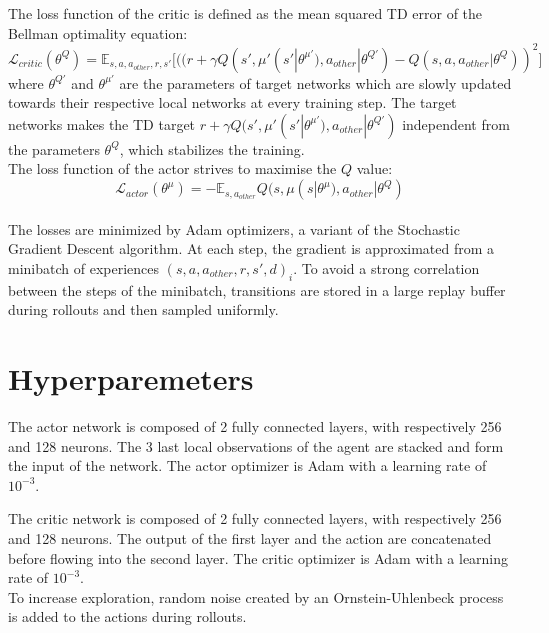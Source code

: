 \documentclass{article}
\begin{document}
    The loss function of the critic is defined as the mean squared TD error of the Bellman optimality equation:
    \[
        \mathcal{L}_{critic}(\theta^Q) = \mathbb{E}_{s, a, a_{other}, r, s'} \big[((r + \gamma Q(s', \mu'(s'| \theta^{\mu'}), a_{other}| \theta^{Q'}) - Q(s, a, a_{other}| \theta^Q))^2\big]
    \]
    where $\theta^{Q'}$ and $\theta^{\mu'}$ are the parameters of target networks which are slowly updated towards their respective local networks at every training step.
    The target networks makes the TD target $r + \gamma Q(s', \mu'(s'| \theta^{\mu'}), a_{other}| \theta^{Q'})$ independent from the parameters $\theta^Q$,
    which stabilizes the training.\\

    The loss function of the actor strives to maximise the $Q$ value:
    \[
        \mathcal{L}_{actor}(\theta^{\mu}) = - \mathbb{E}_{s, a_{other}} Q(s, \mu(s | \theta^\mu), a_{other} | \theta^Q)
    \]\\

    The losses are minimized by Adam optimizers, a variant of the Stochastic Gradient Descent algorithm.
    At each step, the gradient is approximated from a minibatch of experiences ${(s, a, a_{other}, r, s', d)_i}$.
    To avoid a strong correlation between the steps of the minibatch, transitions are stored in a large replay buffer
    during rollouts and then sampled uniformly.


    \section{Hyperparemeters}\label{sec:hyperparemeters}

    The actor network is composed of 2 fully connected layers, with respectively 256 and 128 neurons.
    The 3 last local observations of the agent are stacked and form the input of the network.
    The actor optimizer is Adam with a learning rate of $10^{-3}$.

    The critic network is composed of 2 fully connected layers, with respectively 256 and 128 neurons.
    The output of the first layer and the action are concatenated before flowing into the second layer.
    The critic optimizer is Adam with a learning rate of $10^{-3}$.\\

    To increase exploration, random noise created by an Ornstein-Uhlenbeck process is added to the actions during rollouts.\\
\end{document}
